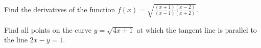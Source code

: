 \begin{exercise}

Find the derivatives of the function
\(f(x)=\sqrt{\frac{(x+1)(x-2)}{(x-1)(x+2)}}\).

\end{exercise}
\vspace*{6\baselineskip}

\begin{exercise}

Find all points on the curve \(y=\sqrt{4x+1}\) at which the tangent line
is parallel to the line \(2x-y=1\).

\end{exercise}
\vspace*{6\baselineskip}

